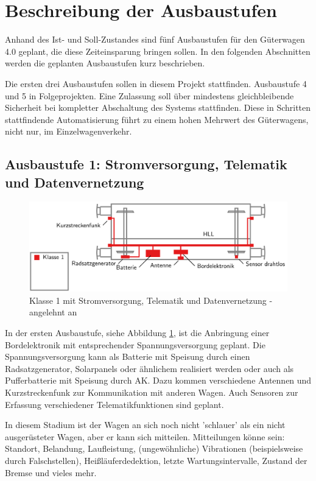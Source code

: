 \section{Beschreibung der Ausbaustufen}
Anhand des Ist- und Soll-Zustandes sind fünf Ausbaustufen für den Güterwagen 4.0 geplant, die diese Zeiteinsparung bringen sollen. In den folgenden Abschnitten werden die geplanten Ausbaustufen kurz beschrieben.\par
Die ersten drei Ausbaustufen sollen in diesem Projekt stattfinden. Ausbaustufe 4 und 5 in Folgeprojekten. Eine Zulassung soll über mindestens gleichbleibende Sicherheit bei kompletter Abschaltung des Systems stattfinden. Diese in Schritten stattfindende Automatisierung führt zu einem hohen Mehrwert des Güterwagens, nicht nur, im Einzelwagenverkehr.\par
\subsection{Ausbaustufe 1: Stromversorgung, Telematik und Datenvernetzung}
\begin{figure}[hbp] 
    \includegraphics[width=\textwidth]{Bilder/Ausbaustufen_1.PNG}
    \caption{Klasse 1 mit Stromversorgung, Telematik und Datenvernetzung - angelehnt an \cite{ETR_3} }
    \label{fig:Klasse1}
\end{figure} 
In der ersten Ausbaustufe, siehe Abbildung \ref{fig:Klasse1}, ist die Anbringung einer Bordelektronik mit  entsprechender Spannungsversorgung geplant. Die Spannungsversorgung kann als Batterie mit Speisung durch einen Radsatzgenerator, Solarpanels oder ähnlichem realisiert werden oder auch als Pufferbatterie mit Speisung durch AK. Dazu kommen verschiedene Antennen und Kurzstreckenfunk zur Kommunikation mit anderen Wagen. Auch Sensoren zur Erfassung verschiedener Telematikfunktionen sind geplant.\par
In diesem Stadium ist der Wagen an sich noch nicht 'schlauer' als ein nicht ausgerüsteter Wagen, aber er kann sich mitteilen. Mitteilungen könne sein: Standort, Belandung, Laufleistung, (ungewöhnliche) Vibrationen (beispielsweise durch Falschstellen), Heißläuferdedektion, letzte Wartungsintervalle, Zustand der Bremse und vieles mehr.\par
